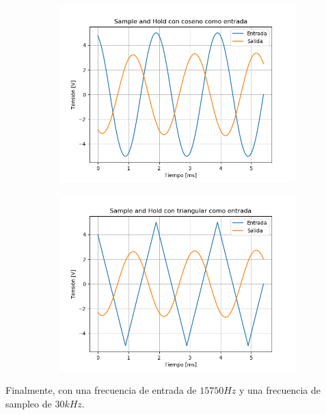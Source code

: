 \begin{figure}[H]
	\begin{subfigure}{.5\textwidth}
	\centering
	\includegraphics[width=\textwidth]{ImagenesEjercicio6/puntob1/SH - Cos.png}
	\end{subfigure}
	\begin{subfigure}{.5\textwidth}
	\centering
	\includegraphics[width=\textwidth]{ImagenesEjercicio6/puntob1/SH - Tri.png}
	\end{subfigure}
\end{figure}

Finalmente, con una frecuencia de entrada de $15750Hz$ y una frecuencia de sampleo de $30kHz$.

